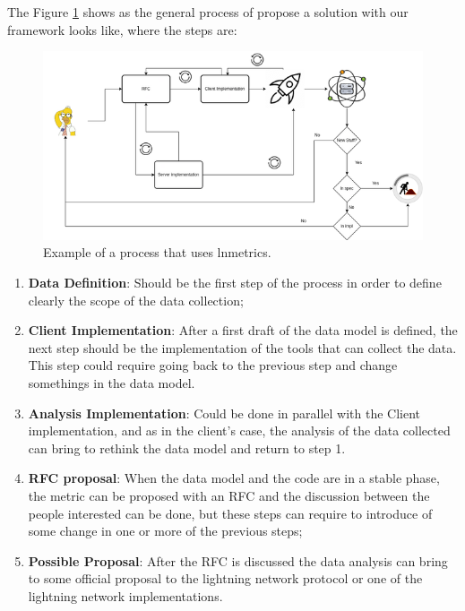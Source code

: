 The Figure \ref{fig:lnmetrics_process} shows as the general process of propose 
a solution with our framework looks like, where the steps are:

\begin{figure}
    \begin{center}
      \includegraphics[scale=0.7]{imgs/lnmetrics-workflow-drawio.png}
    \end{center}
    \caption{Example of a process that uses lnmetrics.}
    \label{fig:lnmetrics_process}
\end{figure}

\begin{enumerate}
    \item {\bf Data Definition}: Should be the first step of the process in order
        to define clearly the scope of the data collection;
    \item {\bf Client Implementation}: After a first draft of the data model is defined,
        the next step should be the implementation of the tools that can collect 
        the data. This step could require going back to the previous step and change 
        somethings in the data model.
    \item {\bf Analysis Implementation}: Could be done in parallel with the Client implementation,
        and as in the client's case, the analysis of the data collected can bring to rethink the data model
        and return to step 1.
    \item {\bf RFC proposal}: When the data model and the code are in a stable phase,
        the metric can be proposed with an RFC and the discussion between the people interested
        can be done, but these steps can require to introduce of some change in one or more of the previous steps;
    \item {\bf Possible Proposal}: After the RFC is discussed the data analysis can bring to some 
        official proposal to the lightning network protocol or one of the lightning network implementations.
\end{enumerate}

